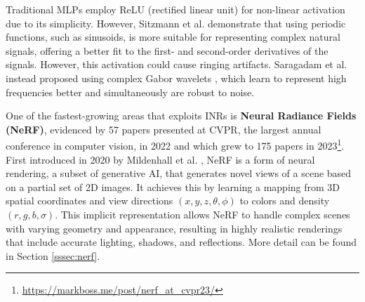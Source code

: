 \documentclass[11pt,a4paper]{article}
\begin{document}
Traditional MLPs employ ReLU (rectified linear unit) for non-linear activation due to its simplicity. However, Sitzmann et al. \cite{sitzmann:siren:2020} demonstrate that using periodic functions, such as sinusoids, is more suitable for representing complex natural signals, offering a better fit to the first- and second-order derivatives of the signals. However, this activation could cause ringing artifacts. Saragadam et al. instead proposed using complex Gabor wavelets \cite{Saragadam:wire:2023}, which learn to represent high frequencies better and simultaneously are robust to noise.

One of the fastest-growing areas that exploits INRs is \textbf{Neural Radiance Fields (NeRF)}, evidenced by 57 papers presented at CVPR, the largest annual conference in computer vision, in 2022 and which grew to 175 papers in 2023\footnote{\url{https://markboss.me/post/nerf_at_cvpr23/}}. First introduced in 2020 by Mildenhall et al. \cite{Mildenhall:NeRF:2020}, NeRF is a form of neural rendering, a subset of generative AI, that generates novel views of a scene based on a partial set of 2D images. It achieves this by learning a mapping from 3D spatial coordinates and view directions $(x,y,z,\theta,\phi)$ to colors and density $(r,g,b,\sigma)$. This implicit representation allows NeRF to handle complex scenes with varying geometry and appearance,  resulting in highly realistic renderings that include accurate lighting, shadows, and reflections. More detail can be found in Section \ref{sssec:nerf}.

\end{document}
